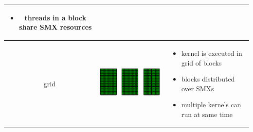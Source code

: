 \begin{frame}[fragile]{}
\begin{center}
\begin{tabular}{|c|m{4cm}|m{5cm}|}
\begin{itemize}
            \item threads in a block share SMX resources
        \end{itemize} \\
    \hline
        grid &
        \begin{minipage}{4cm}
            \includegraphics[width=0.3\textwidth]{./images/smx.pdf}
            \includegraphics[width=0.3\textwidth]{./images/smx.pdf}
            \includegraphics[width=0.3\textwidth]{./images/smx.pdf}
        \end{minipage} &
        \footnotesize
        \begin{itemize}
            \item kernel is executed in grid of blocks
            \item blocks distributed over SMXs
            \item multiple kernels can run at same time
        \end{itemize} \\
\hline
\end{tabular}
\end{center}
\end{frame}

